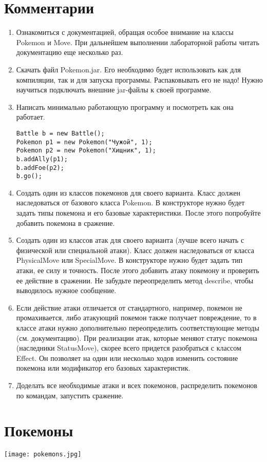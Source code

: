 \section*{Комментарии}
\begin{enumerate}
  \item Ознакомиться с документацией, обращая особое внимание на классы Pokemon и Move. При дальнейшем выполнении лабораторной работы читать документацию еще несколько раз.
  \item Скачать файл Pokemon.jar. Его необходимо будет использовать как для компиляции, так и для запуска программы. Распаковывать его не надо! Нужно научиться подключать внешние jar-файлы к своей программе.
  \item Написать минимально работающую программу и посмотреть как она работает.
        \begin{lstlisting}
Battle b = new Battle();
Pokemon p1 = new Pokemon("Чужой", 1);
Pokemon p2 = new Pokemon("Хищник", 1);
b.addAlly(p1);
b.addFoe(p2);
b.go();
\end{lstlisting}
  \item Создать один из классов покемонов для своего варианта. Класс должен наследоваться от базового класса Pokemon. В конструкторе нужно будет задать типы покемона и его базовые характеристики. После этого попробуйте добавить покемона в сражение.
  \item Создать один из классов атак для своего варианта (лучше всего начать с физической или специальной атаки). Класс должен наследоваться от класса PhysicalMove или SpecialMove. В конструкторе нужно будет задать тип атаки, ее силу и точность. После этого добавить атаку покемону и проверить ее действие в сражении. Не забудьте переопределить метод describe, чтобы выводилось нужное сообщение.
  \item Если действие атаки отличается от стандартного, например, покемон не промахивается, либо атакующий покемон также получает повреждение, то в классе атаки нужно дополнительно переопределить соответствующие методы (см. документацию). При реализации атак, которые меняют статус покемона (наследники StatusMove), скорее всего придется разобраться с классом Effect. Он позволяет на один или несколько ходов изменить состояние покемона или модификатор его базовых характеристик.
  \item Доделать все необходимые атаки и всех покемонов, распределить покемонов по командам, запустить сражение.
\end{enumerate}

\section*{Покемоны}
\begin{center}
  \texttt{[image: pokemons.jpg]}
\end{center}

